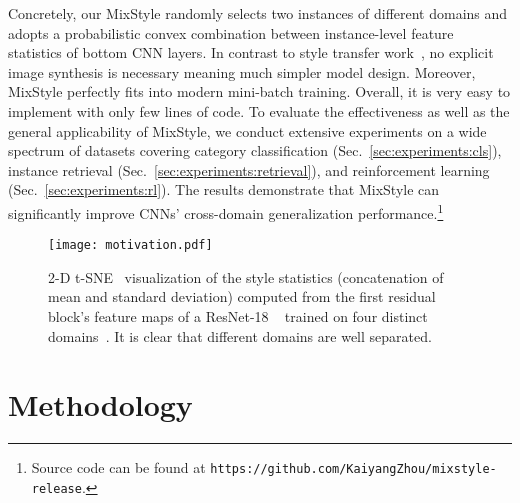 \documentclass{article} \usepackage{iclr2021_conference,times}
\begin{document}
Concretely, our MixStyle randomly selects two instances of different domains and adopts a probabilistic convex combination between instance-level feature statistics of bottom CNN layers. In contrast to style transfer work~\citep{huang2017arbitrary,dumoulin2017learned}, no explicit image synthesis is necessary meaning much simpler model design. Moreover, MixStyle perfectly fits into modern mini-batch training. Overall, it is very easy to implement with only few lines of code. To evaluate the effectiveness as well as the general applicability of MixStyle, we conduct extensive experiments on a wide spectrum of datasets covering category classification (Sec.~\ref{sec:experiments:cls}), instance retrieval (Sec.~\ref{sec:experiments:retrieval}), and reinforcement learning (Sec.~\ref{sec:experiments:rl}). The results demonstrate that MixStyle can significantly improve CNNs' cross-domain generalization performance.\footnote{Source code can be found at \texttt{https://github.com/KaiyangZhou/mixstyle-release}.}

\begin{figure}[t]
    \centering
    \texttt{[image: motivation.pdf]}
    \caption{2-D t-SNE~\citep{tsne} visualization of the style statistics (concatenation of mean and standard deviation) computed from the first residual block's feature maps of a ResNet-18 ~\citep{he2016deep} trained on four distinct domains~\citep{li2017deeper}. It is clear that different domains are well separated. }
    \label{fig:motivation}
\end{figure}


\section{Methodology} \label{sec:method}
\end{document}
